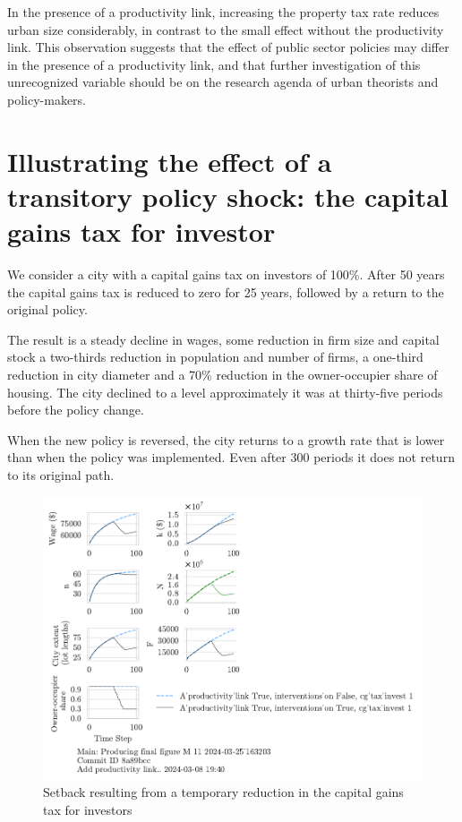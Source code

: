 In the presence of a productivity link, increasing the property tax rate reduces urban size considerably, in contrast to the small effect without the productivity link. This observation suggests that the effect of public sector policies may differ in the presence of a productivity link, and that further investigation of this unrecognized variable should be on the research agenda of urban theorists and policy-makers.



\newpage
\section{Illustrating the effect of a transitory policy shock: the capital gains tax for investor}
We consider a city with a capital gains tax on investors of 100\%. After 50 years the capital gains tax is reduced to zero for 25 years, followed by a return to the original policy.

The result is a steady decline in wages, some reduction in firm size and capital stock a two-thirds reduction in population and number of firms,  a one-third reduction in city diameter and a 70\% reduction in the owner-occupier share of housing. The city declined to a level approximately it was at thirty-five periods before the policy change.

When the new policy is reversed, the city returns to a growth rate that is lower than when the policy was implemented. Even after 300 periods it does not return to its original path.

\begin{figure}[h!tb] 
    \centering
    \includegraphics[scale=1., trim={0 1.4cm 7cm 0},clip]{fig/interventions_on-cg_tax_invest-163203.pdf}  %
    \caption{Setback resulting from a temporary reduction in the capital gains tax for investors}
    \label{fig:cgtax_setback}
\end{figure}



